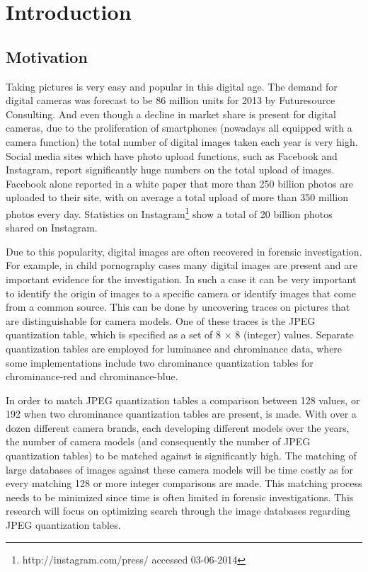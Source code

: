 
\chapter{Introduction} %

\label{ch:name} %



\section{Motivation}

Taking pictures is very easy and popular in this digital age. The demand for digital cameras was forecast to be 86 million units for 2013 by Futuresource Consulting\cite{futuresource}. And even though a decline in market share is present for digital cameras, due to the  proliferation of smartphones (nowadays all equipped with a camera function) the total number of digital images taken each year is very high. Social media sites which have photo upload functions, such as Facebook and Instagram, report significantly huge numbers on the total upload of images. Facebook alone reported in a white paper \cite{whitefacebook} that more than 250 billion photos are uploaded to their site, with on average a total upload of more than 350 million photos every day. Statistics on Instagram\footnote{http://instagram.com/press/ accessed 03-06-2014} show a total of 20 billion photos shared on Instagram.

Due to this popularity, digital images are often recovered in forensic investigation. For example, in child pornography cases many digital images are present and are important evidence for the investigation. In such a case it can be very important to identify the origin of images to a specific camera or identify images that come from a common source. This can be done by uncovering traces on pictures that are distinguishable for camera models. One of these traces is the JPEG quantization table, which is specified as a set of 8 $\times$ 8 (integer) values. Separate quantization tables are employed for luminance and chrominance data, where some implementations include two chrominance quantization tables for chrominance-red and chrominance-blue. 

In order to match JPEG quantization tables a comparison between 128 values, or 192 when two chrominance quantization tables are present, is made. With over a dozen different camera brands, each developing different models over the years, the number of camera models (and consequently the number of JPEG quantization tables) to be matched against is significantly high. The matching of large databases of images against these camera models will be time costly as for every matching 128 or more integer comparisons are made. This matching process needs to be minimized since time is often limited in forensic investigations. This research will focus on optimizing search through the image databases regarding JPEG quantization tables.

